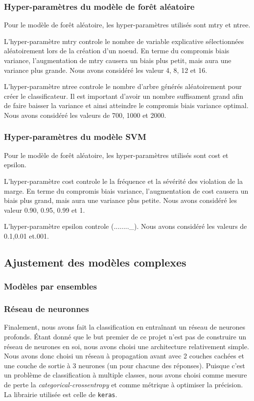 \subsubsection{Hyper-paramètres du modèle de forêt aléatoire}
Pour le modèle de forêt aléatoire, les hyper-paramètres utilisés sont mtry et ntree. 

L'hyper-paramètre mtry controle le nombre de variable explicative sélectionnées aléatoirement lors de la création d'un noeud.  En terme du compromis biais variance, l'augmentation de mtry causera un biais plus petit, mais aura une variance plus grande.  Nous avons considéré les valeur 4, 8, 12 et 16.

L'hyper-paramètre ntree controle le nombre d'arbre générés aléatoirement pour créer le classificateur. Il est important d'avoir un nombre suffisament grand afin de faire baisser la variance et ainsi atteindre le compromis biais variance optimal. Nous avons considéré les valeurs de 700, 1000 et 2000. 



\subsubsection{Hyper-paramètres du modèle SVM}
Pour le modèle de forêt aléatoire, les hyper-paramètres utilisés sont cost et epsilon. 

L'hyper-paramètre cost controle le la fréquence et la sévérité des violation de la marge.  En terme du compromis biais variance, l'augmentation de cost causera un biais plus grand, mais aura une variance plus petite. Nous avons considéré les valeur 0.90, 0.95, 0.99 et 1.

L'hyper-paramètre epsilon controle (........_). Nous avons considéré les valeurs de 0.1,0.01 et.001. 


\subsection{Ajustement des modèles complexes}

\subsubsection{Modèles par ensembles}

\subsubsection{Réseau de neuronnes}

Finalement, nous avons fait la classification en entraînant un réseau de neurones profonds. Étant donné que le but premier de ce projet n'est pas de construire un réseau de neurones en soi, nous avons choisi une architecture relativement simple. Nous avons donc choisi un réseau à propagation avant avec 2 couches cachées et une couche de sortie à 3 neurones (un pour chacune des réponses). Puisque c'est un problème de classification à multiple classes, nous avons choisi comme mesure de perte la \textit{categorical-crossentropy} et comme métrique à optimiser la précision. La librairie utilisée est celle de \texttt{keras}.


